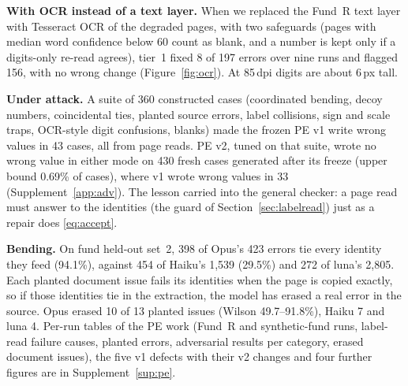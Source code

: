 \textbf{With OCR instead of a text layer.} When we replaced the Fund~R text layer with Tesseract OCR of the degraded pages, with two safeguards (pages with median word confidence below 60 count as blank, and a number is kept only if a digits-only re-read agrees), tier~1 fixed 8 of 197 errors over nine runs and flagged 156, with no wrong change (Figure~\ref{fig:ocr}). At 85\,dpi digits are about 6\,px tall.

\textbf{Under attack.} A suite of 360 constructed cases (coordinated bending, decoy numbers, coincidental ties, planted source errors, label collisions, sign and scale traps, OCR-style digit confusions, blanks) made the frozen PE v1 write wrong values in 43 cases, all from page reads. PE v2, tuned on that suite, wrote no wrong value in either mode on 430 fresh cases generated after its freeze (upper bound 0.69\% of cases), where v1 wrote wrong values in 33 (Supplement~\ref{app:adv}). The lesson carried into the general checker: a page read must answer to the identities (the guard of Section~\ref{sec:labelread}) just as a repair does \eqref{eq:accept}.

\textbf{Bending.} On fund held-out set~2, 398 of Opus's 423 errors tie every identity they feed (94.1\%), against 454 of Haiku's 1,539 (29.5\%) and 272 of luna's 2,805. Each planted document issue fails its identities when the page is copied exactly, so if those identities tie in the extraction, the model has erased a real error in the source. Opus erased 10 of 13 planted issues (Wilson 49.7--91.8\%), Haiku 7 and luna 4.
Per-run tables of the PE work (Fund~R and synthetic-fund runs, label-read failure causes, planted errors, adversarial results per category, erased document issues), the five v1 defects with their v2 changes and four further figures are in Supplement~\ref{sup:pe}.



